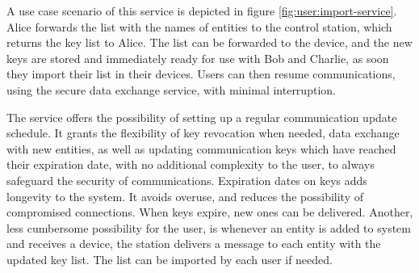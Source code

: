 A use case scenario of this service is depicted in figure \ref{fig:user:import-service}.
Alice forwards the list with the names of entities to the control station, which returns the key list to Alice. The list can be forwarded to the device, and the new keys are stored and immediately ready for use with Bob and Charlie, as soon they import their list in their devices. 
Users can then resume communications, using the secure data exchange service, with minimal interruption.

The service offers the possibility of setting up a regular communication update schedule. It grants the flexibility of key revocation when needed, data exchange with new entities, as well as updating communication keys which have reached their expiration date, with no additional complexity to the user, to always safeguard the security of communications.
Expiration dates on keys adds longevity to the system. It avoids overuse, and reduces the possibility of compromised connections. When keys expire, new ones can be delivered.
Another, less cumbersome possibility for the user, is whenever an entity is added to system and receives a device, the station delivers a message to each entity with the updated key list. The list can be imported by each user if needed.





